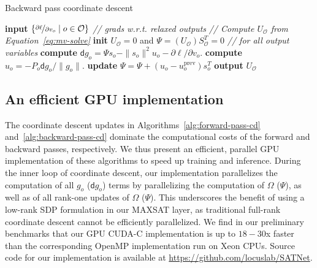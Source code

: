 \documentclass{article}
\newcommand{\dd}{\mathsf{d}}
\newcommand{\outdex}{o}
\newcommand{\outset}{\mathcal{O}}
\begin{document}
	\begin{algorithm}[t]
		\begin{algorithmic}[1]
			\caption{Backward pass coordinate descent}
			\State \textbf{input} $\{\nicefrac{\partial \ell}{\partial v_{\outdex}}\;|\; \outdex \in \outset \}$ \hspace{0.3em} \emph{// grads w.r.t. relaxed outputs}
\vspace{0.25em}
			\State \emph{// Compute 
$U_{\outset}$ from Equation~\eqref{eq:mv-solve}}
\State \textbf{init} $U_{\outset} = 0$ and $\Psi = (U_{\outset})S^T_{\outset} = 0$
			\For{$\outdex \in \outset$} \hspace{1em} \emph{// for all output variables}
			\State \textbf{compute} $\dd g_{\outdex} = \Psi s_{\outdex} - \|s_{\outdex}\|^2 u_{\outdex} - \partial\ell/\partial v_{\outdex}$.
			\State \textbf{compute} $u_{\outdex} = -P_{\outdex}\dd g_{\outdex}/\|g_{\outdex}\|$.
\State \textbf{update} $\Psi = \Psi + (u_{\outdex} - u_{\outdex}^{\text{prev}})s_{\outdex}^T $
			\EndFor
			\EndWhile
			\State \textbf{output} $U_{\outset}$
			\label{alg:backward-pass-cd}
		\end{algorithmic}
	\end{algorithm}
	




	\subsection{An efficient GPU implementation}
	The coordinate descent updates in Algorithms~\ref{alg:forward-pass-cd} and~\ref{alg:backward-pass-cd} dominate the computational costs of the forward and backward passes, respectively.
	We thus present an efficient, parallel GPU implementation of these algorithms to speed up training and inference. 
	During the inner loop of coordinate descent, our implementation parallelizes the computation of all $g_{\outdex}$ ($\dd g_{\outdex}$) terms by parallelizing the computation of $\Omega$ ($\Psi$), as well as of all rank-one updates of $\Omega$ ($\Psi$).
	This 
underscores the benefit of using a low-rank SDP formulation in our MAXSAT layer, as traditional full-rank coordinate descent cannot be efficiently parallelized.
	We find in our preliminary benchmarks that our GPU CUDA-C implementation is up to $18-30$x faster than the corresponding OpenMP implementation run on Xeon CPUs.
Source code for our implementation is available at \url{https://github.com/locuslab/SATNet}.
\end{document}
